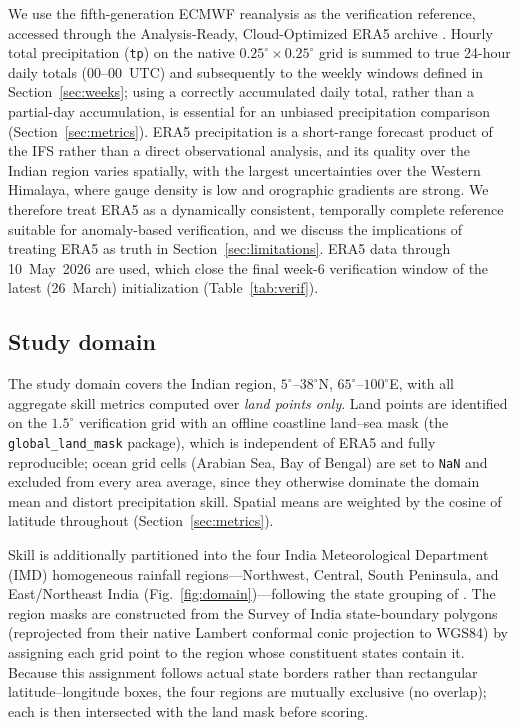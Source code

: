 \documentclass[11pt,a4paper]{article}
\begin{document}
We use the fifth-generation ECMWF reanalysis
\citep[ERA5;][]{hersbach2020} as the verification reference, accessed
through the Analysis-Ready, Cloud-Optimized ERA5 archive
\citep[ARCO-ERA5;][]{carver2023}. Hourly total precipitation
(\texttt{tp}) on the native $0.25^{\circ}\times0.25^{\circ}$ grid is
summed to true 24-hour daily totals (00--00~UTC) and subsequently to the
weekly windows defined in Section~\ref{sec:weeks}; using a correctly
accumulated daily total, rather than a partial-day accumulation, is
essential for an unbiased precipitation comparison
(Section~\ref{sec:metrics}). ERA5 precipitation is a short-range forecast
product of the IFS rather than a direct observational analysis, and its
quality over the Indian region varies spatially, with the largest
uncertainties over the Western Himalaya, where gauge density is low and
orographic gradients are strong. We therefore treat ERA5 as a
dynamically consistent, temporally complete reference suitable for
anomaly-based verification, and we discuss the implications of treating
ERA5 as truth in Section~\ref{sec:limitations}. ERA5 data through
10~May~2026 are used, which close the final week-6 verification window of
the latest (26~March) initialization (Table~\ref{tab:verif}).

\subsection{Study domain}\label{sec:domain}

The study domain covers the Indian region, $5^{\circ}$--$38^{\circ}$N,
$65^{\circ}$--$100^{\circ}$E, with all aggregate skill metrics computed
over \emph{land points only}. Land points are identified on the
$1.5^{\circ}$ verification grid with an offline coastline land--sea mask
(the \texttt{global\_land\_mask} package), which is independent of ERA5
and fully reproducible; ocean grid cells (Arabian Sea, Bay of Bengal) are
set to \texttt{NaN} and excluded from every area average, since they
otherwise dominate the domain mean and distort precipitation skill.
Spatial means are weighted by the cosine of latitude throughout
(Section~\ref{sec:metrics}).

Skill is additionally partitioned into the four India Meteorological
Department (IMD) homogeneous rainfall regions---Northwest, Central, South
Peninsula, and East/Northeast India (Fig.~\ref{fig:domain})---following
the state grouping of \citet{pai2014}. The region masks are constructed
from the Survey of India state-boundary polygons (reprojected from their
native Lambert conformal conic projection to WGS84) by assigning each
grid point to the region whose constituent states contain it. Because
this assignment follows actual state borders rather than rectangular
latitude--longitude boxes, the four regions are mutually exclusive (no
overlap); each is then intersected with the land mask before scoring.
\end{document}
